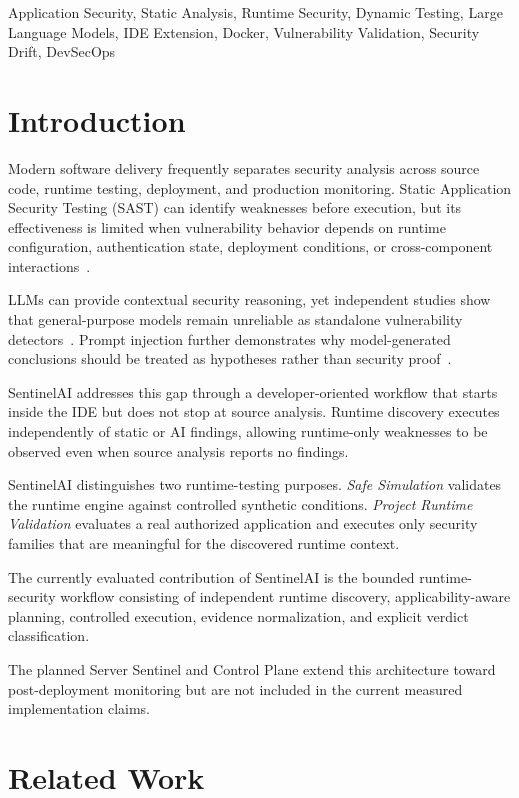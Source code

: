 \documentclass[journal]{IEEEtran}
\begin{document}
\begin{IEEEkeywords}
Application Security, Static Analysis, Runtime Security, Dynamic Testing,
Large Language Models, IDE Extension, Docker, Vulnerability Validation,
Security Drift, DevSecOps
\end{IEEEkeywords}

\section{Introduction}

Modern software delivery frequently separates security analysis across
source code, runtime testing, deployment, and production monitoring.
Static Application Security Testing (SAST) can identify weaknesses before
execution, but its effectiveness is limited when vulnerability behavior
depends on runtime configuration, authentication state, deployment
conditions, or cross-component interactions~\cite{b5}.

LLMs can provide contextual security reasoning, yet independent studies show
that general-purpose models remain unreliable as standalone vulnerability
detectors~\cite{b13,b14}. Prompt injection further demonstrates why
model-generated conclusions should be treated as hypotheses rather than
security proof~\cite{b4}.

SentinelAI addresses this gap through a developer-oriented workflow that
starts inside the IDE but does not stop at source analysis. Runtime discovery
executes independently of static or AI findings, allowing runtime-only
weaknesses to be observed even when source analysis reports no findings.

SentinelAI distinguishes two runtime-testing purposes.
\textit{Safe Simulation} validates the runtime engine against controlled
synthetic conditions. \textit{Project Runtime Validation} evaluates a real
authorized application and executes only security families that are
meaningful for the discovered runtime context.

The currently evaluated contribution of SentinelAI is the bounded
runtime-security workflow consisting of independent runtime discovery,
applicability-aware planning, controlled execution, evidence normalization,
and explicit verdict classification.

The planned Server Sentinel and Control Plane extend this architecture toward
post-deployment monitoring but are not included in the current measured
implementation claims.

\section{Related Work}
\end{document}
